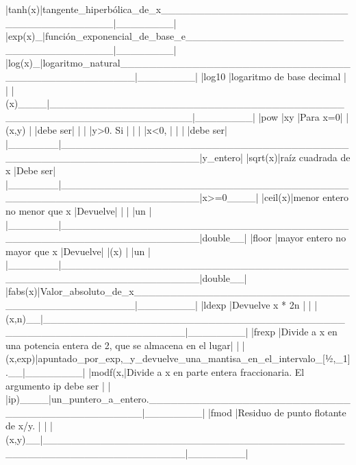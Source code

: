 |tanh(x)|tangente_hiperbólica_de_x_________________________________________|________|
|exp(x)_|función_exponencial_de_base_e_____________________________________|________|
|log(x)_|logaritmo_natural__________________________________________________|________|
|log10  |logaritmo de base decimal                                          |        |
|(x)____|___________________________________________________________________|________|
|pow    |xy                                                                 |Para x=0|
|(x,y)  |                                                                   |debe ser|
|       |                                                                   |y>0. Si |
|       |                                                                   |x<0,    |
|       |                                                                   |debe ser|
|_______|___________________________________________________________________|y_entero|
|sqrt(x)|raíz cuadrada de x                                                |Debe ser|
|_______|___________________________________________________________________|x>=0____|
|ceil(x)|menor entero no menor que x                                        |Devuelve|
|       |                                                                   |un      |
|_______|___________________________________________________________________|double__|
|floor  |mayor entero no mayor que x                                        |Devuelve|
|(x)    |                                                                   |un      |
|_______|___________________________________________________________________|double__|
|fabs(x)|Valor_absoluto_de_x________________________________________________|________|
|ldexp  |Devuelve x * 2n                                                    |        |
|(x,n)__|___________________________________________________________________|________|
|frexp  |Divide a x en una potencia entera de 2, que se almacena en el lugar|        |
|(x,exp)|apuntado_por_exp,_y_devuelve_una_mantisa_en_el_intervalo_[½,_1].__|________|
|modf(x,|Divide a x en parte entera fraccionaria. El argumento ip debe ser  |        |
|ip)____|un_puntero_a_entero._______________________________________________|________|
|fmod   |Residuo de punto flotante de x/y.                                  |        |
|(x,y)__|___________________________________________________________________|________|


